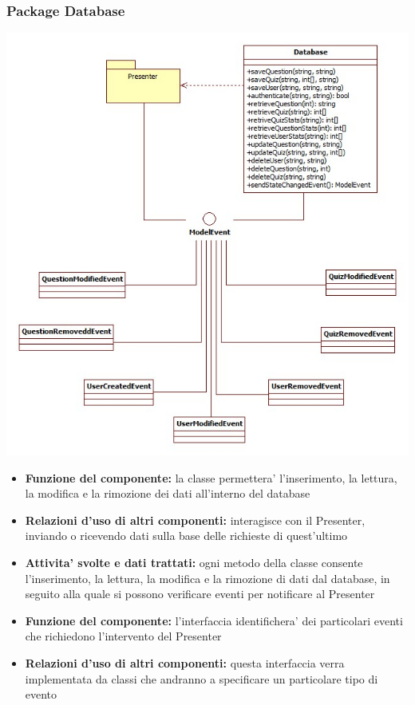 \documentclass[a4paper,11pt]{article}
\begin{document}
			\subsubsection{Package Database}
			\begin{center}
				\includegraphics[scale=0.6]{../images/Database.jpg}
			\end{center}
 			\begin{itemize}
		    	\item\textbf{Funzione del componente:} la classe permettera' l'inserimento, la lettura, la modifica e la rimozione dei dati all'interno del database
			\item\textbf{Relazioni d'uso di altri componenti:} interagisce con il Presenter, inviando o ricevendo dati sulla base delle richieste di quest'ultimo
			\item\textbf{Attivita' svolte e dati trattati:} ogni metodo della classe consente l'inserimento, la lettura, la modifica e la rimozione di dati dal database, in seguito alla quale si possono verificare eventi per notificare al Presenter
			\end{itemize}
			\begin{itemize}
		    	\item\textbf{Funzione del componente:} l'interfaccia identifichera' dei particolari eventi che richiedono l'intervento del Presenter
			\item\textbf{Relazioni d'uso di altri componenti:} questa interfaccia verra implementata da classi che andranno a specificare un particolare tipo di evento
			\end{itemize}
\end{document}
